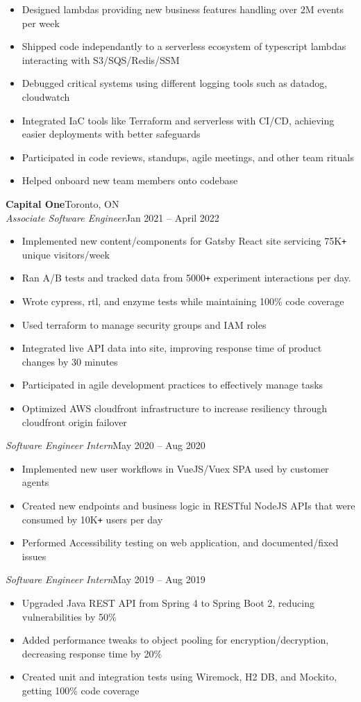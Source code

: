 \documentclass[letterpaper]{article}
\newcommand{\JobEntry}[3]{
	\normalsize\textbf{#1}\hfill\normalsize{#2}\\
	#3\vspace{0.1cm}
}
\newcommand{\DatedEntry}[3]{
	\small\textit{#1}\hfill\small{#2}\\
	\vspace{0.1cm}#3\vspace{0.1cm}
}
\begin{document}
{{\begin{itemize}[nolistsep]
			\item Designed lambdas providing new business features handling over 2M events per week
			\item Shipped code independantly to a serverless ecosystem of typescript lambdas interacting with S3/SQS/Redis/SSM
			\item Debugged critical systems using different logging tools such as datadog, cloudwatch
			\item Integrated IaC tools like Terraform and serverless with CI/CD, achieving easier deployments with better safeguards
			\item Participated in code reviews, standups, agile meetings, and other team rituals
			\item Helped onboard new team members onto codebase
		\end{itemize}
	}
}
\JobEntry{Capital One}{Toronto, ON}
{
	\DatedEntry{Associate Software Engineer}
		{Jan 2021 -- April 2022}
		{
			\begin{itemize}[nolistsep]
				\item Implemented new content/components for Gatsby React site servicing 75K\texttt{+} unique visitors/week
				\item Ran A/B tests and tracked data from 5000\texttt{+} experiment interactions per day.
				\item Wrote cypress, rtl, and enzyme tests while maintaining 100\% code coverage
				\item Used terraform to manage security groups and IAM roles
				\item Integrated live API data into site, improving response time of product changes by 30 minutes
				\item Participated in agile development practices to effectively manage tasks 
				\item Optimized AWS cloudfront infrastructure to increase resiliency through cloudfront origin failover
			\end{itemize}
	}
	\DatedEntry{Software Engineer Intern}
		{May 2020 -- Aug 2020}
		{
			\begin{itemize}[nolistsep]
				\item Implemented new user workflows in VueJS/Vuex SPA used by customer agents
				\item Created new endpoints and business logic in RESTful NodeJS APIs that were consumed by 10K\texttt{+} users per day
				\item Performed Accessibility testing on web application, and documented/fixed issues
			\end{itemize}
		}
	\DatedEntry{Software Engineer Intern}
		{May 2019 -- Aug 2019}
		{
			\begin{itemize}[nolistsep]
				\item Upgraded Java REST API from Spring 4 to Spring Boot 2, reducing vulnerabilities by 50\%
				\item Added performance tweaks to object pooling for encryption/decryption, decreasing response time by 20\%
				\item Created unit and integration tests using Wiremock, H2 DB, and Mockito, getting 100\% code coverage
			\end{itemize}
		}
}
\end{document}
